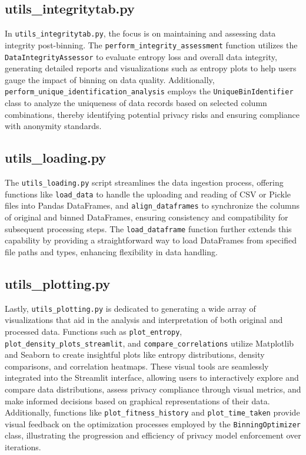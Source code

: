 \documentclass{article}
\begin{document}
\subsection*{utils\_integritytab.py}
In \texttt{utils\_integritytab.py}, the focus is on maintaining and assessing data integrity post-binning. The \texttt{perform\_integrity\_assessment} function utilizes the \texttt{DataIntegrityAssessor} to evaluate entropy loss and overall data integrity, generating detailed reports and visualizations such as entropy plots to help users gauge the impact of binning on data quality. Additionally, \texttt{perform\_unique\_identification\_analysis} employs the \texttt{UniqueBinIdentifier} class to analyze the uniqueness of data records based on selected column combinations, thereby identifying potential privacy risks and ensuring compliance with anonymity standards.

\subsection*{utils\_loading.py}
The \texttt{utils\_loading.py} script streamlines the data ingestion process, offering functions like \texttt{load\_data} to handle the uploading and reading of CSV or Pickle files into Pandas DataFrames, and \texttt{align\_dataframes} to synchronize the columns of original and binned DataFrames, ensuring consistency and compatibility for subsequent processing steps. The \texttt{load\_dataframe} function further extends this capability by providing a straightforward way to load DataFrames from specified file paths and types, enhancing flexibility in data handling.

\subsection*{utils\_plotting.py}
Lastly, \texttt{utils\_plotting.py} is dedicated to generating a wide array of visualizations that aid in the analysis and interpretation of both original and processed data. Functions such as \texttt{plot\_entropy}, \texttt{plot\_density\_plots\_streamlit}, and \texttt{compare\_correlations} utilize Matplotlib and Seaborn to create insightful plots like entropy distributions, density comparisons, and correlation heatmaps. These visual tools are seamlessly integrated into the Streamlit interface, allowing users to interactively explore and compare data distributions, assess privacy compliance through visual metrics, and make informed decisions based on graphical representations of their data. Additionally, functions like \texttt{plot\_fitness\_history} and \texttt{plot\_time\_taken} provide visual feedback on the optimization processes employed by the \texttt{BinningOptimizer} class, illustrating the progression and efficiency of privacy model enforcement over iterations.
\end{document}
